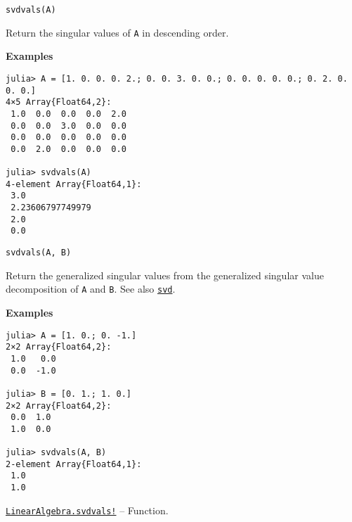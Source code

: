 \begin{adjustwidth}{2em}{0pt}


\begin{verbatim}
svdvals(A)
\end{verbatim}

Return the singular values of \texttt{A} in descending order.

\textbf{Examples}


\begin{verbatim}
julia> A = [1. 0. 0. 0. 2.; 0. 0. 3. 0. 0.; 0. 0. 0. 0. 0.; 0. 2. 0. 0. 0.]
4×5 Array{Float64,2}:
 1.0  0.0  0.0  0.0  2.0
 0.0  0.0  3.0  0.0  0.0
 0.0  0.0  0.0  0.0  0.0
 0.0  2.0  0.0  0.0  0.0

julia> svdvals(A)
4-element Array{Float64,1}:
 3.0
 2.23606797749979
 2.0
 0.0
\end{verbatim}




\begin{lstlisting}
svdvals(A, B)
\end{lstlisting}

Return the generalized singular values from the generalized singular value decomposition of \texttt{A} and \texttt{B}. See also \hyperlink{6661056220970412040}{\texttt{svd}}.

\textbf{Examples}


\begin{verbatim}
julia> A = [1. 0.; 0. -1.]
2×2 Array{Float64,2}:
 1.0   0.0
 0.0  -1.0

julia> B = [0. 1.; 1. 0.]
2×2 Array{Float64,2}:
 0.0  1.0
 1.0  0.0

julia> svdvals(A, B)
2-element Array{Float64,1}:
 1.0
 1.0
\end{verbatim}



\end{adjustwidth}
\hypertarget{590278903094160607}{} 
\hyperlink{590278903094160607}{\texttt{LinearAlgebra.svdvals!}}  -- {Function.}

